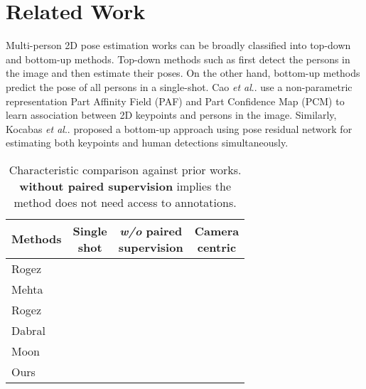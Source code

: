 \documentclass[runningheads]{llncs}
\makeatletter
\DeclareRobustCommand\onedot{\futurelet\@let@token\@onedot}
\def\@onedot{\ifx\@let@token.\else.\null\fi\xspace}
\def\etal{\emph{et al}\onedot}
\newcommand{\cmark}{\color{mint}\ding{52}}\newcommand{\xmark}{\color{awesome}\ding{55}}
\makeatother
\begin{document}
\section{Related Work}

\noindent Multi-person 2D pose estimation works can be broadly classified into top-down and bottom-up methods. Top-down methods such as \cite{chen2018cascaded,newell2016stacked,huang2017coarse,xiao2018simple} first detect the persons in the image and then estimate their poses. On the other hand, bottom-up methods \cite{newell2017associative,pishchulin2016deepcut,insafutdinov2016deepercut,cao2017realtime,nie2019single} predict the pose of all persons in a single-shot. Cao \etal \cite{cao2017realtime} use a non-parametric representation Part Affinity Field (PAF) and Part Confidence Map (PCM) to learn association between 2D keypoints and persons in the image. Similarly, Kocabas \etal \cite{kocabas2018multiposenet} proposed a bottom-up approach using pose residual network for estimating both keypoints and human detections simultaneously. 

\begin{wraptable}[14]{r}{0.45\textwidth}

\caption{{
Characteristic comparison against prior works. \textbf{without paired supervision} implies the method does not need access to annotations.
}}

\centering
\label{tab:characteristic}
\setlength{\tabcolsep}{2.8pt}

\resizebox{0.99\columnwidth}{!}
{
    \begin{tabular}{l|c|c|c}
    
    \hline
    Methods & \makecell{Single \\ shot} & \makecell{\textit{w/o} paired \\ supervision} & \makecell{Camera \\ centric} \\
   
    \hline
    
    Rogez \cite{rogez2017lcr} & \xmark & \xmark  & \xmark\\
    Mehta \cite{mehta2018single}&   \cmark & \xmark  & \xmark\\
    Rogez \cite{rogez2019lcr} &  \xmark & \xmark  & \xmark\\
    Dabral \cite{Dabral2019MultiPerson3H} &  \xmark & \xmark & \cmark \\
    Moon \cite{moon2019camera} &  \xmark & \xmark & \cmark \\
    \hline
    \rowcolor{gray!14}
    Ours  &  \cmark & \cmark  & \cmark \\
    \hline
    \end{tabular}
   
}
\end{wraptable}
\end{document}
